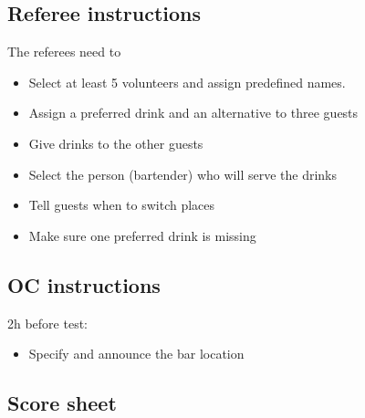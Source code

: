 \subsection*{Referee instructions}

The referees need to
\begin{itemize}
	\item Select at least 5 volunteers and assign predefined names.
	\item Assign a preferred drink and an alternative to three guests
	\item Give drinks to the other guests
	\item Select the person (bartender) who will serve the drinks
	\item Tell guests when to switch places
	\item Make sure one preferred drink is missing
\end{itemize}

\subsection*{OC instructions}

2h before test:
\begin{itemize}
	\item Specify and announce the bar location
\end{itemize}

\subsection*{Score sheet}


